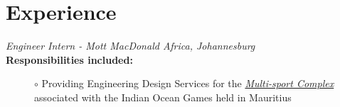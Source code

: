 \documentclass[10pt,a4paper,ragged2e,withhyper]{altacv}
\newcommand{\MySkip} {
		\vskip 
		12pt
	}
\begin{document}
    \begin{adjustbox}{valign=t}
        \begin{minipage}{0.6\textwidth}
            \MySkip
            \section*{Experience}
                \begin{description}
                    	
\item[\normalfont \textcolor{ColorOne}{\textit{Engineer Intern - Mott MacDonald Africa, Johannesburg}}] \break
                 \item[]\break
                  \item[\textbf{Responsibilities included:}]
                 \hfill\break
                           \textcolor{ColorOne}{$\circ$} Providing Engineering Design Services for the \href{https://www.mottmac.com/article/40105/islands-build-bridges-through-sport}\textit{Multi-sport Complex} \newline associated with the Indian Ocean Games held in Mauritius\\
                           

\end{description}
\end{minipage}
\end{adjustbox}
\end{document}
